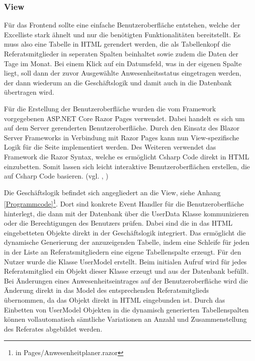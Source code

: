 \subsubsection{View}
\label{sec:View}
Für das Frontend sollte eine einfache Benutzeroberfläche entstehen, welche der Excelliste stark ähnelt und nur die benötigten Funktionalitäten bereitstellt. Es muss also eine Tabelle in HTML gerendert werden, die als Tabellenkopf die Referatsmitglieder in seperaten Spalten beinhaltet sowie zudem die Daten der Tage im Monat. Bei einem Klick auf ein Datumsfeld, was in der eigenen Spalte liegt, soll dann der zuvor Ausgewählte Anwesenheitsstatus eingetragen werden, der dann wiederum an die Geschäftslogik und damit auch in die Datenbank übertragen wird.

Für die Erstellung der Benutzeroberfläche wurden die vom Framework vorgegebenen ASP.NET Core Razor Pages verwendet. Dabei handelt es sich um auf dem Server gerenderten Benutzeroberfläche. Durch den Einsatz des Blazor Server Frameworks in Verbindung mit Razor Pages kann nun View-spezifische Logik für die Seite implementiert werden. Des Weiteren verwendet das Framework die Razor Syntax, welche es ermöglicht Csharp Code direkt in HTML einzubetten. Somit lassen sich leicht interaktive Benutzeroberflächen erstellen, die auf Csharp Code basieren. (vgl. \cite{Razor}, \cite{RazorSyntax})

Die Geschäftslogik befindet sich angegliedert an die View, siehe Anhang \ref{Programmcode}\footnote{in Pages/Anwesenheitplaner.razor}. Dort sind konkrete Event Handler für die Benutzeroberfläche hinterlegt, die dann \zB mit der Datenbank über die UserData Klasse kommunizieren oder die Berechtigungen des Benutzers prüfen. Dabei sind die in das HTML eingebetteten Objekte direkt in der Geschäftslogik integriert. Das ermöglicht die dynamische Generierung der anzuzeigenden Tabelle, indem eine Schleife für jeden in der Liste an Referatsmitgliedern eine eigene Tabellenspalte erzeugt. Für den Nutzer wurde die Klasse UserModel erstellt. Beim initialen Aufruf wird für jedes Referatsmitglied ein Objekt dieser Klasse erzeugt und aus der Datenbank befüllt. Bei Änderungen eines Anwesenheitseintrages auf der Benutzeroberfläche wird die Änderung direkt in das Model des entsprechenden Referatsmitglieds übernommen, da das Objekt direkt in HTML eingebunden ist. Durch das Einbetten von UserModel Objekten in die dynamisch generierten Tabellenspalten können vollautomatisch sämtliche Variationen an Anzahl und Zusammenstellung des Referates abgebildet werden.

